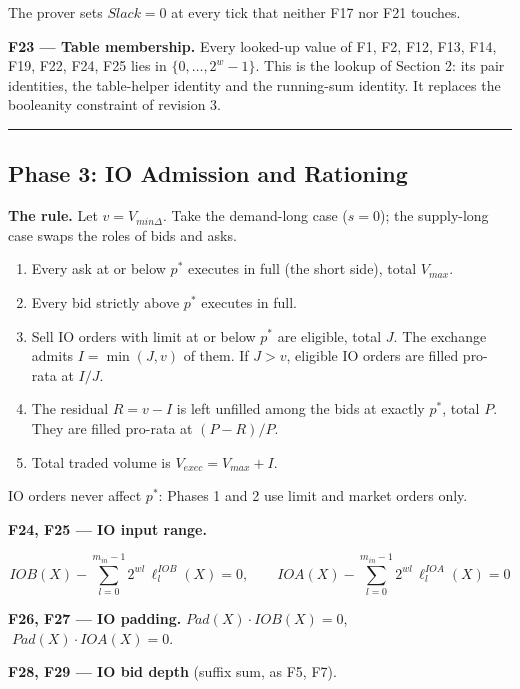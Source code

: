 The prover sets \(Slack = 0\) at every tick that neither F17 nor F21 touches.

\textbf{F23 --- Table membership.} Every looked-up value of F1, F2, F12, F13, F14, F19, F22, F24, F25 lies in \(\{0, \ldots, 2^w-1\}\). This is the lookup of Section 2: its pair identities, the table-helper identity and the running-sum identity. It replaces the booleanity constraint of revision 3.

\begin{center}\rule{0.5\linewidth}{0.5pt}\end{center}

\subsection{Phase 3: IO Admission and Rationing}

\textbf{The rule.} Let \(v = V_{min\Delta}\). Take the demand-long case (\(s = 0\)); the supply-long case swaps the roles of bids and asks.

\begin{enumerate}
\def\labelenumi{\arabic{enumi}.}
\item
  Every ask at or below \(p^*\) executes in full (the short side), total \(V_{max}\).
\item
  Every bid strictly above \(p^*\) executes in full.
\item
  Sell IO orders with limit at or below \(p^*\) are eligible, total \(J\). The exchange admits \(I = \min(J, v)\) of them. If \(J > v\), eligible IO orders are filled pro-rata at \(I / J\).
\item
  The residual \(R = v - I\) is left unfilled among the bids at exactly \(p^*\), total \(P\). They are filled pro-rata at \((P - R)/P\).
\item
  Total traded volume is \(V_{exec} = V_{max} + I\).
\end{enumerate}

IO orders never affect \(p^*\): Phases 1 and 2 use limit and market orders only.

\textbf{F24, F25 --- IO input range.}

\[IOB(X) - \sum_{l=0}^{m_{in}-1} 2^{wl}\, \ell^{IOB}_l(X) = 0, \qquad IOA(X) - \sum_{l=0}^{m_{in}-1} 2^{wl}\, \ell^{IOA}_l(X) = 0\]

\textbf{F26, F27 --- IO padding.} \(Pad(X) \cdot IOB(X) = 0\), \(\;Pad(X) \cdot IOA(X) = 0\).

\textbf{F28, F29 --- IO bid depth} (suffix sum, as F5, F7).

